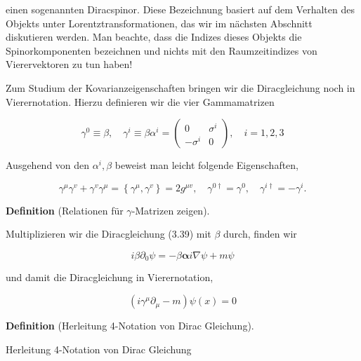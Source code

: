 \documentclass[10pt, letterpaper]{article}
\newcommand{\CustomHeading}[3]{%
  \par\medskip\noindent%
  \textbf{#1 #2} \textnormal{(#3)}.\enskip%
}
\newenvironment{DEF}[2]{\begin{unitbox}\CustomHeading{Definition}{#1}{#2}}{\end{unitbox}}
\begin{document}
einen sogenannten Diracspinor. Diese Bezeichnung basiert auf dem Verhalten des Objekts unter Lorentztransformationen, das wir im nächsten Abschnitt diskutieren werden. Man beachte, dass die Indizes dieses Objekts die Spinorkomponenten bezeichnen und nichts mit den Raumzeitindizes von Vierervektoren zu tun haben!

Zum Studium der Kovarianzeigenschaften bringen wir die Diracgleichung noch in Vierernotation. Hierzu definieren wir die vier Gammamatrizen

$$
\gamma^{0} \equiv \beta, \quad \gamma^{i} \equiv \beta \alpha^{i}=\left(\begin{array}{cc}
0 & \sigma^{i} \\
-\sigma^{i} & 0
\end{array}\right), \quad i=1,2,3
$$

Ausgehend von den $\alpha^{i}, \beta$ beweist man leicht folgende Eigenschaften,

$$
\gamma^{\mu} \gamma^{v}+\gamma^{v} \gamma^{\mu}=\left\{\gamma^{\mu}, \gamma^{v}\right\}=2 g^{\mu v}, \quad \gamma^{0 \dagger}=\gamma^{0}, \quad \gamma^{i \dagger}=-\gamma^{i} .
$$


\begin{DEF}{}{Relationen für $\gamma$-Matrizen zeigen}

\end{DEF}




Multiplizieren wir die Diracgleichung (3.39) mit $\beta$ durch, finden wir

$$
i \beta \partial_{0} \psi=-\beta \boldsymbol{\alpha} i \nabla \psi+m \psi
$$

und damit die Diracgleichung in Vierernotation,

$$
\left(i \gamma^{\mu} \partial_{\mu}-m\right) \psi(x)=0
$$

\begin{DEF}{}{Herleitung 4-Notation von Dirac Gleichung}
Herleitung 4-Notation von Dirac Gleichung
\end{DEF}
\end{document}
